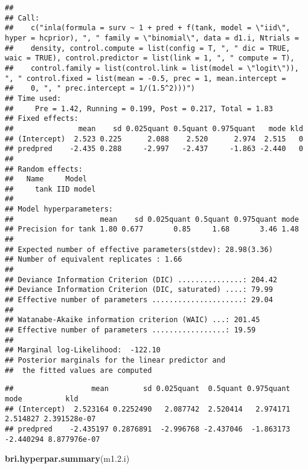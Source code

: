 \documentclass[
]{article}
\newenvironment{Shaded}{\begin{snugshade}}{\end{snugshade}}
\newcommand{\FloatTok}[1]{\textcolor[rgb]{0.00,0.00,0.81}{#1}}
\newcommand{\KeywordTok}[1]{\textcolor[rgb]{0.13,0.29,0.53}{\textbf{#1}}}
\newcommand{\NormalTok}[1]{#1}
\newcommand{\OperatorTok}[1]{\textcolor[rgb]{0.81,0.36,0.00}{\textbf{#1}}}
\begin{document}
\begin{verbatim}
## 
## Call:
##    c("inla(formula = surv ~ 1 + pred + f(tank, model = \"iid\", hyper = hcprior), ", " family = \"binomial\", data = d1.i, Ntrials = 
##    density, control.compute = list(config = T, ", " dic = TRUE, waic = TRUE), control.predictor = list(link = 1, ", " compute = T), 
##    control.family = list(control.link = list(model = \"logit\")), ", " control.fixed = list(mean = -0.5, prec = 1, mean.intercept = 
##    0, ", " prec.intercept = 1/(1.5^2)))") 
## Time used:
##     Pre = 1.42, Running = 0.199, Post = 0.217, Total = 1.83 
## Fixed effects:
##               mean    sd 0.025quant 0.5quant 0.975quant   mode kld
## (Intercept)  2.523 0.225      2.088    2.520      2.974  2.515   0
## predpred    -2.435 0.288     -2.997   -2.437     -1.863 -2.440   0
## 
## Random effects:
##   Name     Model
##     tank IID model
## 
## Model hyperparameters:
##                    mean    sd 0.025quant 0.5quant 0.975quant mode
## Precision for tank 1.80 0.677       0.85     1.68       3.46 1.48
## 
## Expected number of effective parameters(stdev): 28.98(3.36)
## Number of equivalent replicates : 1.66 
## 
## Deviance Information Criterion (DIC) ...............: 204.42
## Deviance Information Criterion (DIC, saturated) ....: 79.99
## Effective number of parameters .....................: 29.04
## 
## Watanabe-Akaike information criterion (WAIC) ...: 201.45
## Effective number of parameters .................: 19.59
## 
## Marginal log-Likelihood:  -122.10 
## Posterior marginals for the linear predictor and
##  the fitted values are computed
\end{verbatim}

\begin{Shaded}
\end{Shaded}

\begin{verbatim}
##                  mean        sd 0.025quant  0.5quant 0.975quant      mode          kld
## (Intercept)  2.523164 0.2252490   2.087742  2.520414   2.974171  2.514827 2.391528e-07
## predpred    -2.435197 0.2876891  -2.996768 -2.437046  -1.863173 -2.440294 8.877976e-07
\end{verbatim}

\begin{Shaded}
\begin{Highlighting}[]
\KeywordTok{bri.hyperpar.summary}\NormalTok{(m1.}\FloatTok{2.}\NormalTok{i)}
\end{Highlighting}
\end{Shaded}
\end{document}
